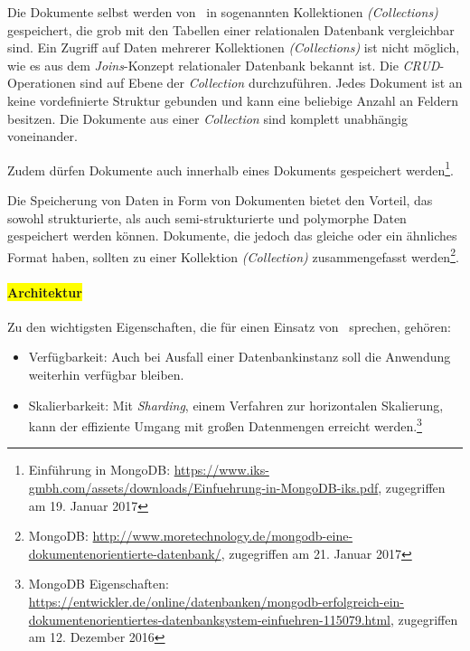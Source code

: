 Die Dokumente selbst werden von \mongo\ in sogenannten Kollektionen \textit{(Collections)} gespeichert, die grob mit den Tabellen einer relationalen Datenbank vergleichbar sind. Ein Zugriff auf Daten mehrerer Kollektionen \textit{(Collections)} ist nicht möglich, wie es aus dem \textit{Joins}-Konzept relationaler Datenbank bekannt ist. Die \textit{CRUD}-Operationen sind auf Ebene der \textit{Collection} durchzuführen. Jedes Dokument ist an keine vordefinierte Struktur gebunden und kann eine beliebige Anzahl an Feldern besitzen. Die Dokumente aus einer \textit{Collection} sind komplett unabhängig voneinander. 

Zudem dürfen Dokumente auch innerhalb eines Dokuments gespeichert werden\footnote{Einführung in MongoDB: \url{https://www.iks-gmbh.com/assets/downloads/Einfuehrung-in-MongoDB-iks.pdf}, zugegriffen am 19. Januar 2017}. 

Die Speicherung von Daten in Form von Dokumenten bietet den Vorteil, das sowohl strukturierte, als auch semi-strukturierte und polymorphe Daten gespeichert werden können. Dokumente, die jedoch das gleiche oder ein ähnliches Format haben, sollten zu einer Kollektion \textit{(Collection)} zusammengefasst werden\footnote{MongoDB: \url{http://www.moretechnology.de/mongodb-eine-dokumentenorientierte-datenbank/}, zugegriffen am 21. Januar 2017}.

\paragraph{\colorbox{yellow}{Architektur}}

Zu den wichtigsten Eigenschaften, die für einen Einsatz von \mongo\ sprechen, gehören:
\begin{itemize}
\item Verfügbarkeit: Auch bei Ausfall einer Datenbankinstanz soll die Anwendung weiterhin verfügbar bleiben.
\item Skalierbarkeit: Mit \textit{Sharding}, einem Verfahren zur horizontalen Skalierung, kann der effiziente Umgang mit großen Datenmengen erreicht werden.\footnote{MongoDB Eigenschaften: \url{https://entwickler.de/online/datenbanken/mongodb-erfolgreich-ein-dokumentenorientiertes-datenbanksystem-einfuehren-115079.html}, zugegriffen am 12. Dezember 2016}
\end{itemize}

